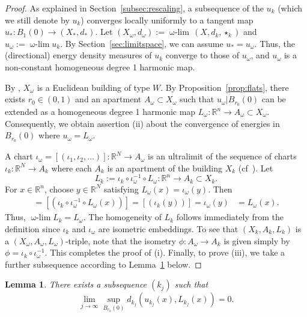 \documentclass[12pt]{amsart}
\newtheorem{lemma}[theorem]{Lemma}
\theoremstyle{definition}
\numberwithin{equation}{section}
\newcommand{\R}{\mathbb R}
\newcommand{\B}{B}
\newcommand\wlim{\mathop{\mbox{$\omega$-$\lim$}}}
\begin{document}
\begin{proof}
As explained in Section~\ref{subsec:rescaling}, a subsequence of the $u_k$ (which we still denote by $u_k$) converges locally uniformly to a tangent map $u_*:B_1(0) \to (X_*,d_*)$. Let  $(X_\omega,d_\omega):=\wlim \, (X,d_k, \star_k)$ and  $u_\omega:=\wlim u_k$. By  Section~\ref{sec:limitspace}, we can assume $u_*=u_\omega$. Thus, the (directional) energy density measures   of $u_k$ converge to those of $u_\omega$, and  $u_\omega$ is a non-constant homogeneous degree 1 harmonic map.    


By \cite[Theorem 5.1.1]{kleiner-leeb}, $X_\omega$ is a Euclidean building of type $W$.
By Proposition~\ref{prop:flats}, there exists $r_0 \in (0,1)$ and an apartment $A_\omega \subset X_\omega$ such that $u_\omega|B_{r_0}(0)$ can be extended  as a homogeneous degree 1 harmonic map $L_\omega:\R^n \rightarrow A_\omega \subset X_\omega$. 
Consequently, we obtain assertion (ii) about  the convergence of energies in $B_{r_0}(0)$ where $u_\omega=L_\omega$.

A chart  $\iota_\omega=[(\iota_1, \iota_2, \dots)]:\R^N \to A_\omega$  is an ultralimit of the sequence of charts $\iota_k: \R^N \rightarrow A_k$  where each $A_k$ is an apartment of the building $X_k$ (cf~\cite[Proof of Theorem 5.1.1]{kleiner-leeb}).
Let
\begin{equation}\label{eq:Lk}
L_k:= \iota_k \circ \iota_\omega^{-1} \circ L_\omega: \R^n \to A_k \subset X_k.
\end{equation}
For $x \in \R^n$, choose  $y \in \R^N$ satisfying $L_\omega(x) = \iota_\omega(y)$. Then
\begin{align*}
[(L_k(x))] =[(\iota_k \circ \iota_\omega^{-1} \circ L_\omega(x))]
=[(\iota_k(y))]
=\iota_\omega(y)
&=L_\omega(x).
\end{align*} 
Thus, $\wlim L_k= L_\omega$. 
The homogeneity of $L_k$ follows immediately from the definition since $\iota_k$ and $\iota_\omega$ are isometric embeddings.  To see that  $(X_k, A_k, L_k)$ is a $(X_\omega, A_\omega, L_\omega)$-triple,  note that the isometry $\phi:A_\omega \to A_k$ is given simply by $\phi= \iota_k \circ \iota_\omega^{-1}$.   This completes the proof of (i).
Finally, to prove (iii), we take a further subsequence according to Lemma~\ref{lem:ukLk} below.
\end{proof}

\begin{lemma}\label{lem:ukLk}
There exists a subsequence $(k_j)$ such that
\[
\lim_{j \rightarrow \infty} \sup_{\B_{r_0}(0)}d_{k_j}(u_{k_j}(x), L_{k_j}(x)) = 0.
\]
\end{lemma}
\end{document}
